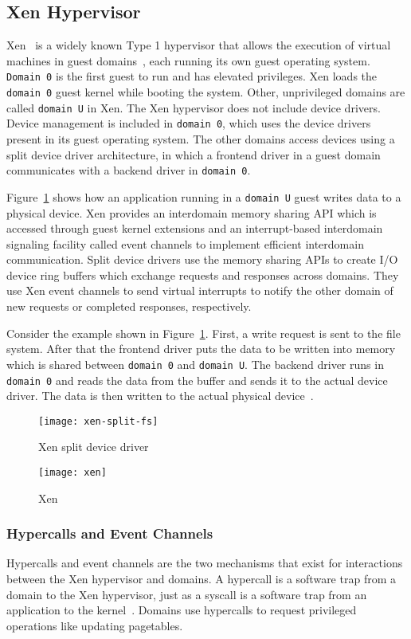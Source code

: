 \subsection{Xen Hypervisor}
Xen~\cite{barham2003xen} is a widely known Type 1 hypervisor
that allows the execution of virtual machines in guest 
domains~\cite{king2003operating}, each running its own
guest operating system.
\texttt{Domain 0} is the first guest to
run and has elevated privileges. Xen loads the \texttt{domain 0} guest
kernel while booting the system.  Other, unprivileged domains are called 
\texttt{domain U} in Xen. 
The Xen hypervisor does not include device drivers. Device management is
included in \texttt{domain 0}, which uses the
device drivers present in its guest operating system. The other domains
access devices using a split device driver architecture, in which a
frontend driver in a guest domain communicates with a backend driver in
\texttt{domain 0}.

Figure~\ref{xen-split2} shows how an application running in a
\texttt{domain U} guest writes data to a physical device. Xen
provides an interdomain memory sharing API which is accessed through 
guest kernel extensions and an interrupt-based interdomain signaling
facility called event channels to implement efficient interdomain
communication. Split device drivers use the memory sharing APIs to
create I/O device ring buffers which exchange requests and responses
across domains. They use Xen event channels to send virtual interrupts 
to notify the other domain of new requests or completed responses, 
respectively.

Consider the example shown in Figure~\ref{xen-split2}. First, a write
request is sent to the file system. After that the frontend driver
puts the data to be written into memory which is shared between \texttt{domain 0} and
\texttt{domain U}. The backend driver runs in \texttt{domain 0} and reads the data from the
buffer and sends it to the actual device driver. The data is then written
to the actual physical device~\cite{Chisnall:2007:DGX:1407351}.

\begin{figure}[!h]
\centering
\texttt{[image: xen-split-fs]}
\caption{Xen split device driver}
\label{xen-split2}
\end{figure}
\begin{figure}[!h]
\centering
\texttt{[image: xen]}
\caption{Xen}
\label{xen}
\end{figure}

\subsubsection*{Hypercalls and Event Channels}
Hypercalls and event channels are the two mechanisms that exist for
interactions between the Xen hypervisor and domains. A hypercall is a
software trap from a domain to the Xen hypervisor, just as a syscall is a
software trap from an application to the kernel~\cite{hypercall}. Domains
use hypercalls to request privileged operations like updating pagetables.


